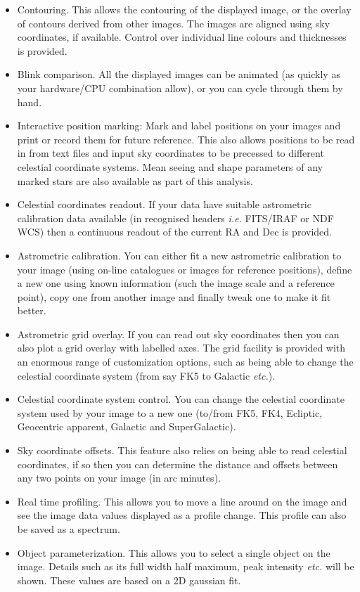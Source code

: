 \documentclass[twoside,11pt]{article}
\renewcommand{\_}{\texttt{\symbol{95}}}
\begin{document}
\begin{itemize}
\item Contouring. This allows the contouring of the displayed image,
 or the overlay of contours derived from other images. The images are
 aligned using sky coordinates, if available. Control over individual
 line colours and thicknesses is provided.

\item Blink comparison. All the displayed images can be animated
  (as quickly as your hardware/CPU combination allow), or
  you can cycle through them by hand.

\item Interactive position marking: Mark and label positions on your
  images and print or record them for future reference. This also
  allows positions to be read in from text files and input sky
  coordinates to be precessed to different celestial coordinate
  systems. Mean seeing and shape parameters of any marked stars are
  also available as part of this analysis.

\item Celestial coordinates readout. If your data have suitable
  astrometric calibration data available (in recognised headers
  {\em i.e.} FITS/IRAF or NDF WCS) then a continuous readout of the
  current RA and Dec is provided.

\item Astrometric calibration. You can either fit a new
  astrometric calibration to your image (using on-line catalogues or
  images for reference positions), define a new one using known
  information (such the image scale and a reference point), copy one
  from another image and finally tweak one to make it fit better.

\item Astrometric grid overlay. If you can read out sky coordinates
  then you can also plot a grid overlay with labelled
  axes. The grid facility is provided with an enormous range of
  customization options, such as being able to change the
  celestial coordinate system (from say FK5 to  Galactic {\em etc.}).

\item Celestial coordinate system control. You can change the celestial
  coordinate system used by your image to a new one (to/from FK5,
  FK4, Ecliptic, Geocentric apparent, Galactic and SuperGalactic).

\item Sky coordinate offsets. This feature also relies on being
  able to read celestial coordinates, if so then you can
  determine the distance and offsets between any two points on
  your image (in arc minutes).

\item Real time profiling. This allows you to move a line around on
  the image and see the image data values displayed as a
  profile change. This profile can also be saved as a spectrum.

\item Object parameterization. This allows you to select a single
  object on the image. Details such as its full width half
  maximum, peak intensity {\em etc.} will be shown. These values are
  based on a 2D gaussian fit.
\end{itemize}
\end{document}
